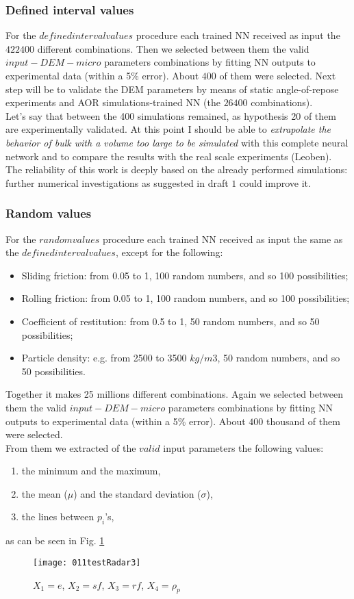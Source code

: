 \subsubsection{Defined interval values}
\label{subsubsection:definedintervalvalues}

For the $defined interval values$ procedure each trained NN received as input the $422400$ different combinations.
Then we selected between them the valid $input-DEM-micro$ parameters combinations by fitting NN outputs to experimental data (within a 5\% error).
About $400$ of them were selected.
Next step will be to validate the DEM parameters by means of static angle-of-repose experiments and AOR simulations-trained NN (the $26400$ combinations).\\

Let's say that between the 400 simulations remained, as hypothesis 20 of them are experimentally validated. At this point I should be able to \textit{extrapolate the behavior of bulk with a volume too large to be simulated} with this complete neural network and to compare the results with the real scale experiments (Leoben).\\

The reliability of this work is deeply based on the already performed simulations: further numerical investigations as suggested in draft $1$ could improve it.\\


\subsubsection{Random values}
\label{subsubsection:randomvalues}

For the $random values$ procedure each trained NN received as input the same as the $defined interval values$, except for the following:
\begin{itemize}
\item{Sliding friction: from 0.05 to 1, 100 random numbers, and so 100 possibilities;}
\item{Rolling friction: from 0.05 to 1, 100 random numbers, and so 100 possibilities;}
\item{Coefficient  of restitution: from 0.5 to 1, 50 random numbers, and so 50 possibilities;}
\item{Particle density: e.g. from 2500 to 3500 $kg/m3$, 50 random numbers, and so 50 possibilities.}
\end{itemize}
Together it makes 25 millions different combinations.
Again we selected between them the valid $input-DEM-micro$ parameters combinations by fitting NN outputs to experimental data (within a 5\% error).
About $400$ thousand of them were selected.\\
From them we extracted of the $valid$ input parameters the following values:
\begin{enumerate}
\item{the minimum and the maximum,}
\item{the mean ($\mu$) and the standard deviation ($\sigma$),}
\item{the lines between $p_i$'s,}
\end{enumerate}
as can be seen in Fig. \ref{011testRadar3}

\begin{figure}[!h]
\texttt{[image: 011testRadar3]}
\caption{$X_1 = e$, $X_2 = sf$, $X_3 = rf$, $X_4 = \rho_p$}
\label{011testRadar3}
\end{figure}